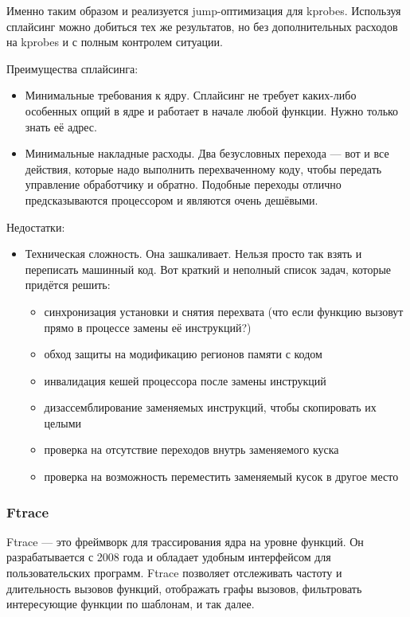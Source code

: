 \documentclass[a4paper,14pt]{extarticle}
\begin{document}
 	Именно таким образом и реализуется jump-оптимизация для kprobes. Используя сплайсинг можно добиться тех же результатов, но без дополнительных расходов на kprobes и с полным контролем ситуации.
 	
 	Преимущества сплайсинга:
 	\begin{itemize}
 		\item Минимальные требования к ядру. Сплайсинг не требует каких-либо особенных опций в ядре и работает в начале любой функции. Нужно только знать её адрес.
 		\item Минимальные накладные расходы. Два безусловных перехода — вот и все действия, которые надо выполнить перехваченному коду, чтобы передать управление обработчику и обратно. Подобные переходы отлично предсказываются процессором и являются очень дешёвыми.
 	\end{itemize}
 	
 	Недостатки:
 	\begin{itemize}
 		\item Техническая сложность. Она зашкаливает. Нельзя просто так взять и переписать машинный код. Вот краткий и неполный список задач, которые придётся решить:
 		\begin{itemize}
 			\item синхронизация установки и снятия перехвата (что если функцию вызовут прямо в процессе замены её инструкций?)
 			\item обход защиты на модификацию регионов памяти с кодом
 			\item инвалидация кешей процессора после замены инструкций
 			\item дизассемблирование заменяемых инструкций, чтобы скопировать их целыми
 			\item проверка на отсутствие переходов внутрь заменяемого куска
 			\item проверка на возможность переместить заменяемый кусок в другое место
 		\end{itemize}
 	\end{itemize}
 
 	\subsubsection{Ftrace}
 	
 	Ftrace — это фреймворк для трассирования ядра на уровне функций. Он разрабатывается с 2008 года и обладает удобным интерфейсом для пользовательских программ. Ftrace позволяет отслеживать частоту и длительность вызовов функций, отображать графы вызовов, фильтровать интересующие функции по шаблонам, и так далее.
 	
\end{document}
